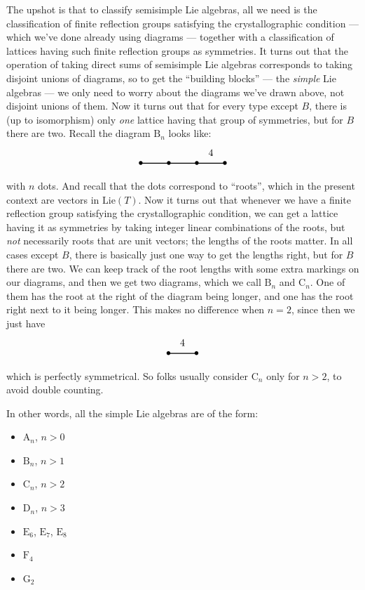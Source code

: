 \documentclass{article}
\def\tightlist{}
\begin{document}
The upshot is that to classify semisimple Lie algebras, all we need is
the classification of finite reflection groups satisfying the
crystallographic condition --- which we've done already using diagrams
--- together with a classification of lattices having such finite
reflection groups as symmetries. It turns out that the operation of
taking direct sums of semisimple Lie algebras corresponds to taking
disjoint unions of diagrams, so to get the ``building blocks'' --- the
\emph{simple} Lie algebras --- we only need to worry about the diagrams
we've drawn above, not disjoint unions of them. Now it turns out that
for every type except \(B\), there is (up to isomorphism) only
\emph{one} lattice having that group of symmetries, but for \(B\) there
are two. Recall the diagram \(\mathrm{B}_n\) looks like: \[
  \begin{tikzpicture}
    \draw[thick] (0,0) node{$\bullet$} to (1,0) node{$\bullet$} to (2,0) node{$\bullet$} to node[label=above:{4}]{} (3,0) node {$\bullet$};
  \end{tikzpicture}
\] with \(n\) dots. And recall that the dots correspond to ``roots'',
which in the present context are vectors in \(\mathrm{Lie}(T)\). Now it
turns out that whenever we have a finite reflection group satisfying the
crystallographic condition, we can get a lattice having it as symmetries
by taking integer linear combinations of the roots, but \emph{not}
necessarily roots that are unit vectors; the lengths of the roots
matter. In all cases except \(B\), there is basically just one way to
get the lengths right, but for \(B\) there are two. We can keep track of
the root lengths with some extra markings on our diagrams, and then we
get two diagrams, which we call \(\mathrm{B}_n\) and \(\mathrm{C}_n\).
One of them has the root at the right of the diagram being longer, and
one has the root right next to it being longer. This makes no difference
when \(n = 2\), since then we just have \[
  \begin{tikzpicture}
    \draw[thick] (0,0) node{$\bullet$} to node[label=above:{4}]{} (1,0) node {$\bullet$};
  \end{tikzpicture}
\] which is perfectly symmetrical. So folks usually consider
\(\mathrm{C}_n\) only for \(n > 2\), to avoid double counting.

In other words, all the simple Lie algebras are of the form:

\begin{itemize}
\tightlist
\item
  \(\mathrm{A}_n\), \(n > 0\)
\item
  \(\mathrm{B}_n\), \(n > 1\)
\item
  \(\mathrm{C}_n\), \(n > 2\)
\item
  \(\mathrm{D}_n\), \(n > 3\)
\item
  \(\mathrm{E}_6\), \(\mathrm{E}_7\), \(\mathrm{E}_8\)
\item
  \(\mathrm{F}_4\)
\item
  \(\mathrm{G}_2\)
\end{itemize}
\end{document}
